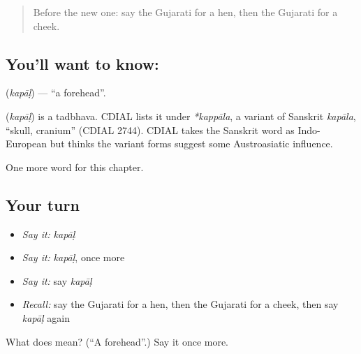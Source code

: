 \label{lesson:GU-C124-kapal}



\begin{quote}
Before the new one: say the Gujarati for a hen, then the Gujarati for a cheek.
\end{quote}

\subsection*{You'll want to know: }
\textbf{} (\emph{kapāḷ}) — \textquotedblleft{}a forehead\textquotedblright{}.

\begin{cousinweb}
\textbf{} (\emph{kapāḷ}) is a tadbhava. CDIAL lists it under \emph{*kappāla}, a variant of Sanskrit \emph{kapāla}, \textquotedblleft{}skull, cranium\textquotedblright{} (CDIAL 2744). CDIAL takes the Sanskrit word as Indo-European but thinks the variant forms suggest some Austroasiatic influence.
\end{cousinweb}

\begin{grammarlens}[title={What you've built}]
One more word for this chapter.
\end{grammarlens}

\subsection*{Your turn}
\begin{itemize}
\raggedright
  \item \emph{Say it:} \emph{kapāḷ}
  \item \emph{Say it:} \emph{kapāḷ}, once more
  \item \emph{Say it:} say \emph{kapāḷ}
  \item \emph{Recall:} say the Gujarati for a hen, then the Gujarati for a cheek, then say \emph{kapāḷ} again
\end{itemize}

\begin{tcolorbox}[breakable,colback=teal!4,colframe=teal!35!black,title={Before you move on}]
What does  mean? (\textquotedblleft{}A forehead\textquotedblright{}.) Say it once more.
\end{tcolorbox}
